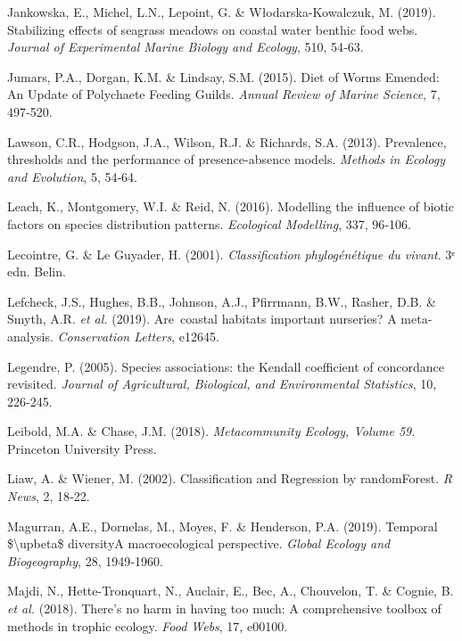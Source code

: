 \documentclass[12pt,]{article}
\newlength{\cslhangindent}
\newenvironment{cslreferences}%
  {\setlength{\parindent}{0pt}%
  \everypar{\setlength{\hangindent}{\cslhangindent}}\ignorespaces}%
  {\par}
\begin{document}
\begin{cslreferences}
\leavevmode\hypertarget{ref-Jankowska_2019}{}%
Jankowska, E., Michel, L.N., Lepoint, G. \& Włodarska-Kowalczuk, M.
(2019). Stabilizing effects of seagrass meadows on coastal water benthic
food webs. \emph{Journal of Experimental Marine Biology and Ecology},
510, 54‑63.

\leavevmode\hypertarget{ref-Jumars_2015}{}%
Jumars, P.A., Dorgan, K.M. \& Lindsay, S.M. (2015). Diet of Worms
Emended: An Update of Polychaete Feeding Guilds. \emph{Annual Review of
Marine Science}, 7, 497‑520.

\leavevmode\hypertarget{ref-Lawson_2013}{}%
Lawson, C.R., Hodgson, J.A., Wilson, R.J. \& Richards, S.A. (2013).
Prevalence, thresholds and the performance of presence-absence models.
\emph{Methods in Ecology and Evolution}, 5, 54‑64.

\leavevmode\hypertarget{ref-Leach_2016}{}%
Leach, K., Montgomery, W.I. \& Reid, N. (2016). Modelling the influence
of biotic factors on species distribution patterns. \emph{Ecological
Modelling}, 337, 96‑106.

\leavevmode\hypertarget{ref-Lecointre_2001}{}%
Lecointre, G. \& Le Guyader, H. (2001). \emph{Classification
phylogénétique du vivant}. 3ᵉ edn. Belin.

\leavevmode\hypertarget{ref-Lefcheck_2019}{}%
Lefcheck, J.S., Hughes, B.B., Johnson, A.J., Pfirrmann, B.W., Rasher,
D.B. \& Smyth, A.R. \emph{et al.} (2019). Are~coastal habitats important
nurseries? A meta-analysis. \emph{Conservation Letters}, e12645.

\leavevmode\hypertarget{ref-Legendre_2005}{}%
Legendre, P. (2005). Species associations: the Kendall coefficient of
concordance revisited. \emph{Journal of Agricultural, Biological, and
Environmental Statistics}, 10, 226‑245.

\leavevmode\hypertarget{ref-Leibold_2018}{}%
Leibold, M.A. \& Chase, J.M. (2018). \emph{Metacommunity Ecology, Volume
59}. Princeton University Press.

\leavevmode\hypertarget{ref-Liaw_2002}{}%
Liaw, A. \& Wiener, M. (2002). Classification and Regression by
randomForest. \emph{R News}, 2, 18‑22.

\leavevmode\hypertarget{ref-Magurran_2019}{}%
Magurran, A.E., Dornelas, M., Moyes, F. \& Henderson, P.A. (2019).
Temporal \$\textbackslash upbeta\$ diversityA macroecological
perspective. \emph{Global Ecology and Biogeography}, 28, 1949‑1960.

\leavevmode\hypertarget{ref-Majdi_2018}{}%
Majdi, N., Hette-Tronquart, N., Auclair, E., Bec, A., Chouvelon, T. \&
Cognie, B. \emph{et al.} (2018). There's no harm in having too much: A
comprehensive toolbox of methods in trophic ecology. \emph{Food Webs},
17, e00100.


\end{cslreferences}
\end{document}
